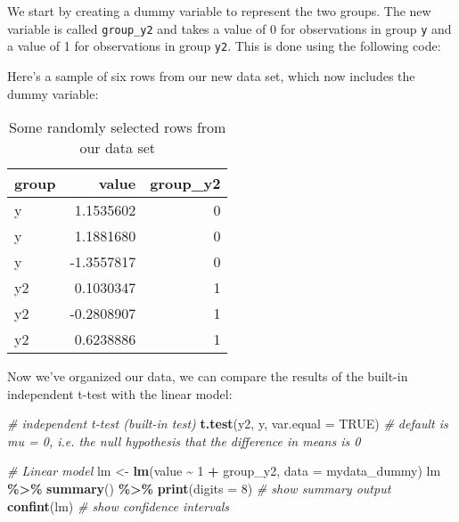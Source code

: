 \documentclass[
  12pt,
]{krantz}
\newenvironment{Shaded}{\begin{snugshade}}{\end{snugshade}}
\newcommand{\CommentTok}[1]{\textcolor[rgb]{0.56,0.35,0.01}{\textit{#1}}}
\newcommand{\DataTypeTok}[1]{\textcolor[rgb]{0.13,0.29,0.53}{#1}}
\newcommand{\DecValTok}[1]{\textcolor[rgb]{0.00,0.00,0.81}{#1}}
\newcommand{\KeywordTok}[1]{\textcolor[rgb]{0.13,0.29,0.53}{\textbf{#1}}}
\newcommand{\NormalTok}[1]{#1}
\newcommand{\OperatorTok}[1]{\textcolor[rgb]{0.81,0.36,0.00}{\textbf{#1}}}
\newcommand{\OtherTok}[1]{\textcolor[rgb]{0.56,0.35,0.01}{#1}}
\newcommand{\StringTok}[1]{\textcolor[rgb]{0.31,0.60,0.02}{#1}}
\begin{document}
We start by creating a dummy variable to represent the two groups. The new variable is called \texttt{group\_y2} and takes a value of 0 for observations in group \texttt{y} and a value of 1 for observations in group \texttt{y2}. This is done using the following code:

Here's a sample of six rows from our new data set, which now includes the dummy variable:

\begin{table}

\caption{\label{tab:unnamed-chunk-29}Some randomly selected rows from our data set}
\centering
\begin{tabular}[t]{lrr}
\toprule
group & value & group\_y2\\
\midrule
y & 1.1535602 & 0\\
y & 1.1881680 & 0\\
y & -1.3557817 & 0\\
y2 & 0.1030347 & 1\\
y2 & -0.2808907 & 1\\
\addlinespace
y2 & 0.6238886 & 1\\
\bottomrule
\end{tabular}
\end{table}

Now we've organized our data, we can compare the results of the built-in independent t-test with the linear model:

\begin{Shaded}
\begin{Highlighting}[]
\CommentTok{\# independent t{-}test (built{-}in test)}
\KeywordTok{t.test}\NormalTok{(y2, y, }\DataTypeTok{var.equal =} \OtherTok{TRUE}\NormalTok{)}
\CommentTok{\# default is mu = 0, i.e. the null hypothesis that the difference in means is 0}

\CommentTok{\# Linear model}
\NormalTok{lm \textless{}{-}}\StringTok{ }\KeywordTok{lm}\NormalTok{(value }\OperatorTok{\textasciitilde{}}\StringTok{ }\DecValTok{1} \OperatorTok{+}\StringTok{ }\NormalTok{group\_y2, }\DataTypeTok{data =}\NormalTok{ mydata\_dummy)}
\NormalTok{  lm }\OperatorTok{\%\textgreater{}\%}\StringTok{ }\KeywordTok{summary}\NormalTok{() }\OperatorTok{\%\textgreater{}\%}\StringTok{ }\KeywordTok{print}\NormalTok{(}\DataTypeTok{digits =} \DecValTok{8}\NormalTok{) }\CommentTok{\# show summary output}
  \KeywordTok{confint}\NormalTok{(lm) }\CommentTok{\# show confidence intervals}
\end{Highlighting}
\end{Shaded}
\end{document}
